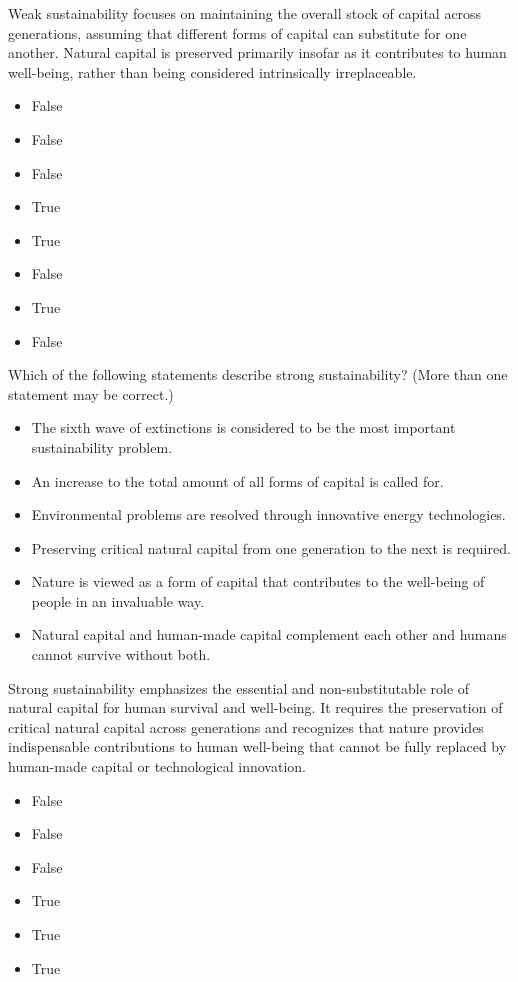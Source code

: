 \documentclass[
  a4paper,
  DIV=11,
  numbers=noendperiod,
  oneside,
  openany]{scrreprt}
\providecommand{\tightlist}{%
  \setlength{\itemsep}{0pt}\setlength{\parskip}{0pt}}
\begin{document}
Weak sustainability focuses on maintaining the overall stock of capital
across generations, assuming that different forms of capital can
substitute for one another. Natural capital is preserved primarily
insofar as it contributes to human well-being, rather than being
considered intrinsically irreplaceable.

\begin{itemize}
\tightlist
\item
  False
\item
  False
\item
  False
\item
  True
\item
  True
\item
  False
\item
  True
\item
  False
\end{itemize}

Which of the following statements describe strong sustainability? (More
than one statement may be correct.)

\begin{itemize}
\tightlist
\item[$\square$]
  The sixth wave of extinctions is considered to be the most important
  sustainability problem.
\item[$\square$]
  An increase to the total amount of all forms of capital is called for.
\item[$\square$]
  Environmental problems are resolved through innovative energy
  technologies.
\item[$\square$]
  Preserving critical natural capital from one generation to the next is
  required.
\item[$\square$]
  Nature is viewed as a form of capital that contributes to the
  well-being of people in an invaluable way.
\item[$\square$]
  Natural capital and human-made capital complement each other and
  humans cannot survive without both.
\end{itemize}

Strong sustainability emphasizes the essential and non-substitutable
role of natural capital for human survival and well-being. It requires
the preservation of critical natural capital across generations and
recognizes that nature provides indispensable contributions to human
well-being that cannot be fully replaced by human-made capital or
technological innovation.

\begin{itemize}
\tightlist
\item
  False
\item
  False
\item
  False
\item
  True
\item
  True
\item
  True
\end{itemize}
\end{document}
